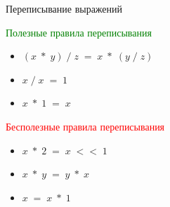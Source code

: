 \documentclass[aspectratio=169
  , xcolor={svgnames}
  , russian  %
  ]{beamer}
\begin{document}
\begin{frame}{Переписывание выражений}

{
\centering

\Huge
{}

\vspace{1cm}


}

{
\centering

\Huge
{}

\vspace{1cm}

\Large
{}

\vfill

}

{
\centering

\Huge
{}

\vspace{1cm}

\Large
{}

\vfill

\begin{multicols}{2}
    \textcolor{green}{Полезные правила переписывания}
    \begin{itemize}
        \item $(x\; * \;y) \;/ \;z \;= \;x\; * \;(y \;/ \;z)$
        \item $x \; / \; x \; = \; 1$
        \item $x \; * \; 1 \; = \; x$ 
    \end{itemize}

    \columnbreak
    
    {\fontsize{13.1}{12}\selectfont \textcolor{red}{Бесполезные правила переписывания}}
    \begin{itemize}
        \item $x\; * \;2 \; = \;  x \; << \; 1$
        \item $x \;*\; y \;= \;y \;* \;x$
        \item $x \;= \;x \;* \;1$
    \end{itemize}
\end{multicols}
}
\end{frame}
\end{document}
